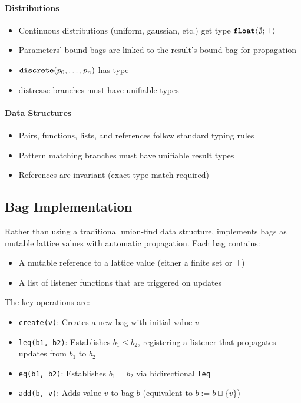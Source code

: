 \paragraph{Distributions}
\begin{itemize}
    \item Continuous distributions (uniform, gaussian, etc.) get type $\text{\ttfamily\bfseries float}\langle \emptyset; \top \rangle$
    \item Parameters' bound bags are linked to the result's bound bag for propagation
    \item $\text{\ttfamily\bfseries discrete}(p_0, \ldots, p_n)$ has type \intty{}
    \item $\text{distrcase}$ branches must have unifiable types
\end{itemize}

\paragraph{Data Structures}
\begin{itemize}
    \item Pairs, functions, lists, and references follow standard typing rules
    \item Pattern matching branches must have unifiable result types
    \item References are invariant (exact type match required)
\end{itemize}

\subsection{Bag Implementation}

Rather than using a traditional union-find data structure, \Slice{} implements bags as mutable lattice values with automatic propagation. Each bag contains:
\begin{itemize}
    \item A mutable reference to a lattice value (either a finite set or $\top$)
    \item A list of listener functions that are triggered on updates
\end{itemize}

The key operations are:
\begin{itemize}
    \item \texttt{create(v)}: Creates a new bag with initial value $v$
    \item \texttt{leq(b1, b2)}: Establishes $b_1 \leq b_2$, registering a listener that propagates updates from $b_1$ to $b_2$
    \item \texttt{eq(b1, b2)}: Establishes $b_1 = b_2$ via bidirectional \texttt{leq}
    \item \texttt{add(b, v)}: Adds value $v$ to bag $b$ (equivalent to $b := b \sqcup \{v\}$)
\end{itemize}

